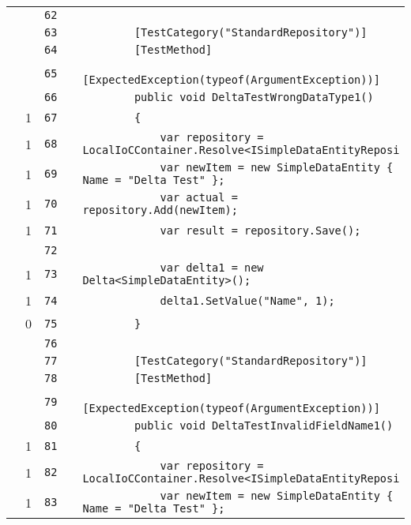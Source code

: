 \documentclass[a4paper,10pt]{article}
\begin{document}
\begin{longtable}[l]{lrrll}
\cellcolor{gray} &  & \verb~62~ & & \verb~~\\
\cellcolor{gray} &  & \verb~63~ & & \verb~        [TestCategory("StandardRepository")]~\\
\cellcolor{gray} &  & \verb~64~ & & \verb~        [TestMethod]~\\
\cellcolor{gray} &  & \verb~65~ & & \verb~        [ExpectedException(typeof(ArgumentException))]~\\
\cellcolor{gray} &  & \verb~66~ & & \verb~        public void DeltaTestWrongDataType1()~\\
\cellcolor{green} & 1 & \verb~67~ & & \verb~        {~\\
\cellcolor{green} & 1 & \verb~68~ & & \verb~            var repository = LocalIoCContainer.Resolve<ISimpleDataEntityReposi~\\
\cellcolor{green} & 1 & \verb~69~ & & \verb~            var newItem = new SimpleDataEntity { Name = "Delta Test" };~\\
\cellcolor{green} & 1 & \verb~70~ & & \verb~            var actual = repository.Add(newItem);~\\
\cellcolor{green} & 1 & \verb~71~ & & \verb~            var result = repository.Save();~\\
\cellcolor{gray} &  & \verb~72~ & & \verb~~\\
\cellcolor{green} & 1 & \verb~73~ & & \verb~            var delta1 = new Delta<SimpleDataEntity>();~\\
\cellcolor{green} & 1 & \verb~74~ & & \verb~            delta1.SetValue("Name", 1);~\\
\cellcolor{red} & 0 & \verb~75~ & & \verb~        }~\\
\cellcolor{gray} &  & \verb~76~ & & \verb~~\\
\cellcolor{gray} &  & \verb~77~ & & \verb~        [TestCategory("StandardRepository")]~\\
\cellcolor{gray} &  & \verb~78~ & & \verb~        [TestMethod]~\\
\cellcolor{gray} &  & \verb~79~ & & \verb~        [ExpectedException(typeof(ArgumentException))]~\\
\cellcolor{gray} &  & \verb~80~ & & \verb~        public void DeltaTestInvalidFieldName1()~\\
\cellcolor{green} & 1 & \verb~81~ & & \verb~        {~\\
\cellcolor{green} & 1 & \verb~82~ & & \verb~            var repository = LocalIoCContainer.Resolve<ISimpleDataEntityReposi~\\
\cellcolor{green} & 1 & \verb~83~ & & \verb~            var newItem = new SimpleDataEntity { Name = "Delta Test" };~\\

\end{longtable}
\end{document}
